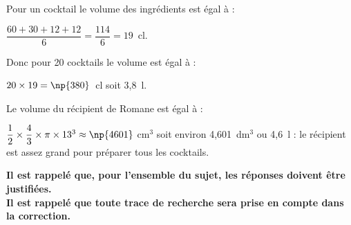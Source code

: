 
\medskip

%
%
%
%
%
%
%
%
Pour un cocktail le volume des ingrédients est égal à :

$\dfrac{60 + 30 + 12 + 12}{6} = \dfrac{114}{6} = 19$~cl.

Donc pour 20 cocktails le volume est égal à :

$20 \times 19 = \np{380}$~cl soit 3,8~l.

Le volume du récipient de Romane est égal à :

$\dfrac{1}{2} \times \dfrac{4}{3}\times \pi \times 13^3 \approx \np{4601}~$cm$^3$ soit environ 4,601~dm$^3$ ou 4,6~l : le récipient est assez grand pour préparer tous les cocktails.
\medskip

\textbf{Il est rappelé que, pour l'ensemble du sujet, les réponses doivent être justifiées.\\
Il est rappelé que toute trace de recherche sera prise en compte dans la
correction.}
